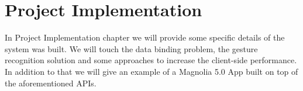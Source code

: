 \chapter{Project Implementation}
\label{implementation}
In Project Implementation chapter we will provide some specific details of the
system was built. We will touch the data binding problem, the gesture
recognition solution and some approaches to increase the client-side
performance. In addition to that we will give an example of a Magnolia 5.0 App
built on top of the aforementioned APIs.









\pagebreak